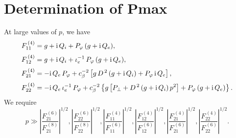 \documentclass[12pt,prb,aps,notitlepage]{revtex4-1}
\begin{document}
 \section{Determination of Pmax}
 At large values of $p$, we have
 \begin{align}
 F_{11}^{\,(4)} &= g + {\rm i}\,Q_i + P_\varphi\,(g+{\rm i}\,Q_e),\\[0.5ex]
 F_{12}^{\,(4)} &= g+{\rm i}\,Q_i + \iota_e^{-1}\,P_\varphi\,(g+{\rm i}\,Q_e),\\[0.5ex]
 F_{21}^{\,(4)} &= - {\rm i}\,Q_e\,P_\varphi + c_\beta^{-2}\left[g\,D^{\,2}\,(g+{\rm i}\,Q_i) + P_\varphi\,{\rm i}\,Q_e\right],\\[0.5ex]
 F_{22}^{\,(4)} &= -{\rm i}\,Q_e\,\iota_e^{-1}\,P_\varphi + c_\beta^{-2}\left\{g\left[P_\perp + D^{\,2}\,(g+{\rm i}\,Q_i)\,p^2\right]
 + P_\varphi\,(g+{\rm i}\,Q_e)\right\}.
 \end{align}
 We require
 \begin{equation}
 p\gg \left|\frac{F_{21}^{\,(6)}}{F_{21}^{\,(8)}}\right|^{1/2}, \left|\frac{F_{22}^{\,(6)}}{F_{22}^{\,(8)}}\right|^{1/2}, 
 \left|\frac{F_{11}^{\,(4)}}{F_{11}^{\,(6)}}\right|^{1/2},\left|\frac{F_{12}^{\,(4)}}{F_{12}^{\,(6)}}\right|^{1/2},\left|\frac{F_{21}^{\,(4)}}{F_{21}^{\,(6)}}\right|^{1/2},
 \left|\frac{F_{22}^{\,(4)}}{F_{22}^{\,(6)}}\right|^{1/2}.
 \end{equation}
\end{document}
